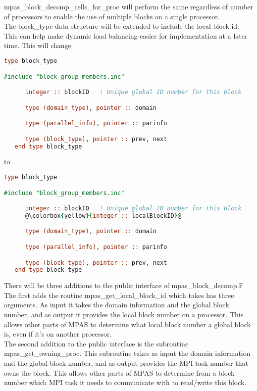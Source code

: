 \documentclass[11pt]{report}
\begin{document}
mpas\_block\_decomp\_cells\_for\_proc will perform the same regardless of
number of processors to enable the use of multiple blocks on a single
processor. \\

The block\_type data structure will be extended to include the local block id.
This can help make dynamic load balancing easier for implementation at a later
time. This will change

\begin{lstlisting}[language=fortran,escapechar=@,frame=single]
   type block_type

#include "block_group_members.inc"

      integer :: blockID   ! Unique global ID number for this block

      type (domain_type), pointer :: domain

      type (parallel_info), pointer :: parinfo

      type (block_type), pointer :: prev, next
   end type block_type

\end{lstlisting}

to

\begin{lstlisting}[language=fortran,escapechar=@,frame=single]
   type block_type

#include "block_group_members.inc"

      integer :: blockID   ! Unique global ID number for this block
      @\colorbox{yellow}{integer :: localBlockID}@

      type (domain_type), pointer :: domain

      type (parallel_info), pointer :: parinfo

      type (block_type), pointer :: prev, next
   end type block_type

\end{lstlisting}

There will be three additions to the public interface of mpas\_block\_decomp.F
The first adds the routine mpas\_get\_local\_block\_id which takes has three
arguments. As input it takes the domain information and the global block
number, and as output it provides the local block number on a processor. This
allows other parts of MPAS to determine what local block number a global block
is, even if it's on another processor. \\

The second addition to the public interface is the subroutine
mpas\_get\_owning\_proc. This subroutine takes as input the domain information
and the global block number, and as output provides the MPI task number that
owns the block. This allows other parts of MPAS to determine from a block
number which MPI task it needs to communicate with to read/write this block. \\
\end{document}
